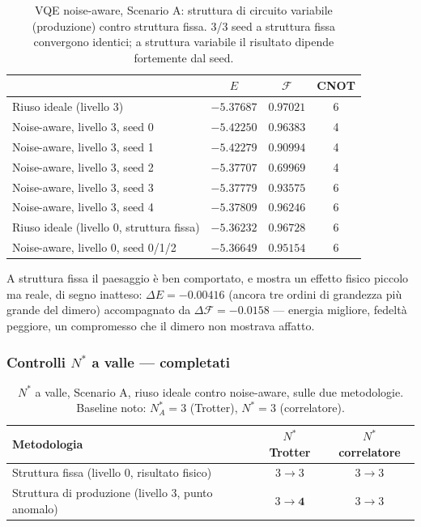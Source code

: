 \documentclass[11pt,a4paper]{article}
\begin{document}
\begin{table}[htbp]
\centering
\caption{VQE noise-aware, Scenario A: struttura di circuito variabile
(produzione) contro struttura fissa. 3/3 seed a struttura fissa
convergono identici; a struttura variabile il risultato dipende fortemente
dal seed.}
\label{tab:anello-noiseaware-preliminare}
\begin{tabular}{lccc}
\toprule
& $E$ & $\mathcal F$ & CNOT \\
\midrule
Riuso ideale (livello 3) & $-5.37687$ & $0.97021$ & 6 \\
Noise-aware, livello 3, seed 0 & $-5.42250$ & $0.96383$ & 4 \\
Noise-aware, livello 3, seed 1 & $-5.42279$ & $0.90994$ & 4 \\
Noise-aware, livello 3, seed 2 & $-5.37707$ & $0.69969$ & 4 \\
Noise-aware, livello 3, seed 3 & $-5.37779$ & $0.93575$ & 6 \\
Noise-aware, livello 3, seed 4 & $-5.37809$ & $0.96246$ & 6 \\
\midrule
Riuso ideale (livello 0, struttura fissa) & $-5.36232$ & $0.96728$ & 6 \\
Noise-aware, livello 0, seed 0/1/2 & $-5.36649$ & $0.95154$ & 6 \\
\bottomrule
\end{tabular}
\end{table}

A struttura fissa il paesaggio è ben comportato, e mostra un effetto fisico
piccolo ma reale, di segno inatteso: $\Delta E=-0.00416$ (ancora tre ordini
di grandezza più grande del dimero) accompagnato da $\Delta\mathcal
F=-0.0158$ --- energia migliore, fedeltà peggiore, un compromesso che il
dimero non mostrava affatto.


\subsubsection*{Controlli $N^*$ a valle --- completati}

\begin{table}[htbp]
\centering
\caption{$N^*$ a valle, Scenario A, riuso ideale contro noise-aware, sulle
due metodologie. Baseline noto: $N^*_A=3$ (Trotter), $N^*=3$ (correlatore).}
\label{tab:anello-Nstar-passo1}
\begin{tabular}{lcc}
\toprule
Metodologia & $N^*$ Trotter & $N^*$ correlatore \\
\midrule
Struttura fissa (livello 0, risultato fisico) & $3\to3$ & $3\to3$ \\
Struttura di produzione (livello 3, punto anomalo) & $3\to\mathbf{4}$ & $3\to3$ \\
\bottomrule
\end{tabular}
\end{table}
\end{document}
